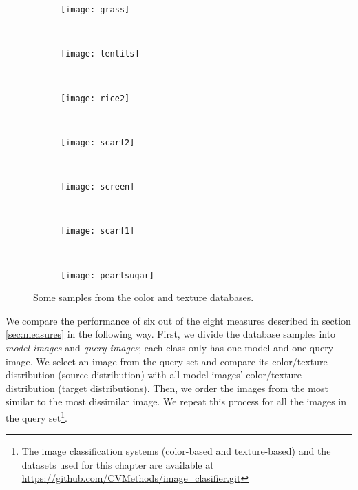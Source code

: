 \begin{figure}[!ht]
        
    \begin{subfigure}[b]{0.12\textwidth}
		\centering
		\texttt{[image: grass]}	
	\end{subfigure}
	~ %
    \begin{subfigure}[b]{0.12\textwidth}
		\centering
		\texttt{[image: lentils]}	
	\end{subfigure}
    ~ %
    \begin{subfigure}[b]{0.12\textwidth}
		\centering
		\texttt{[image: rice2]}	
	\end{subfigure}
	~ %
    \begin{subfigure}[b]{0.12\textwidth}
		\centering
		\texttt{[image: scarf2]}	
	\end{subfigure}
    ~ %
    \begin{subfigure}[b]{0.12\textwidth}
		\centering
		\texttt{[image: screen]}	
	\end{subfigure}
    ~ %
    \begin{subfigure}[b]{0.12\textwidth}
		\centering
		\texttt{[image: scarf1]}	
	\end{subfigure}
    ~ %
    \begin{subfigure}[b]{0.12\textwidth}
		\centering
		\texttt{[image: pearlsugar]}	
	\end{subfigure}
		
    \caption{Some samples from the color and texture databases.}
    \label{fig:databases}
\end{figure}

We compare the performance of six out of the eight measures described in section \ref{sec:measures} in the following way. First, we divide the database samples into \textit{model images} and \textit{query images}; each class only has one model and one query image. We select an image from the query set and compare its color/texture distribution (source distribution) with all model images' color/texture distribution (target distributions). Then, we order the images from the most similar to the most dissimilar image. We repeat this process for all the images in the query set\footnote{The image classification systems (color-based and texture-based) and the datasets used for this chapter are available at \url{https://github.com/CVMethods/image_clasifier.git}}.
 
